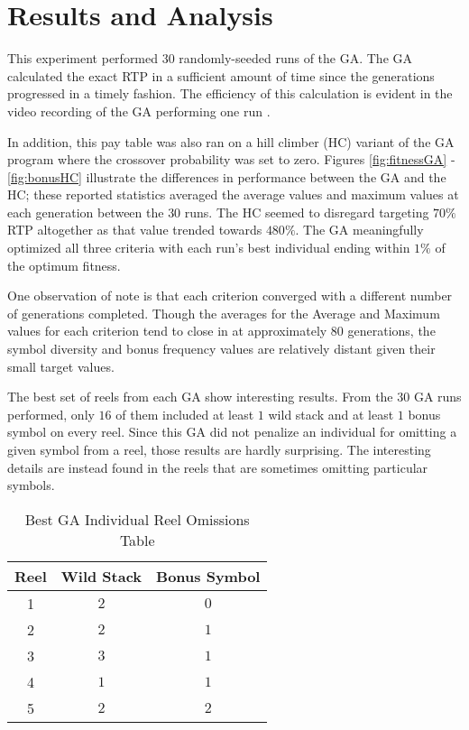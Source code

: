 \documentclass[conference]{IEEEtran}
\begin{document}
\section{Results and Analysis}
\label{result}
This experiment performed $30$ randomly-seeded runs of the GA.
The GA calculated the exact RTP in a sufficient amount of time since the generations progressed in a timely fashion. The efficiency of this calculation is evident in the video recording of the GA performing one run \cite{VideoRecording}.
\par
In addition, this pay table was also ran on a hill climber (HC) variant of the GA program where the crossover probability was set to zero.
Figures \ref{fig:fitnessGA} - \ref{fig:bonusHC} illustrate the differences in performance between the GA and the HC; these reported statistics averaged the average values and maximum values at each generation between the $30$ runs.
The HC seemed to disregard targeting $70\%$ RTP altogether as that value trended towards $480\%$.
The GA meaningfully optimized all three criteria with each run's best individual ending within $1\%$ of the optimum fitness.
\par
One observation of note is that each criterion converged with a different number of generations completed.
Though the averages for the Average and Maximum values for each criterion tend to close in at approximately $80$ generations, the symbol diversity and bonus frequency values are relatively distant given their small target values.
\par
The best set of reels from each GA show interesting results.
From the $30$ GA runs performed, only $16$ of them included at least $1$ wild stack and at least $1$ bonus symbol on every reel.
Since this GA did not penalize an individual for omitting a given symbol from a reel, those results are hardly surprising.
The interesting details are instead found in the reels that are sometimes omitting particular symbols.
\begin{table}[htbp]
\caption{Best GA Individual Reel Omissions Table}
\begin{center}
\begin{tabular}{|c|c|c|}
\hline
\textbf{Reel}&\textbf{Wild Stack}&\textbf{Bonus Symbol} \\
\hline
1 & $2$ & $0$ \\
\hline
2 & $2$ & $1$  \\
\hline
3 & $3$ & $1$ \\
\hline
4 & $1$ & $1$  \\
\hline
5 & $2$ & $2$  \\
\hline
\end{tabular}
\label{omissions}
\end{center}
\end{table}
\end{document}
